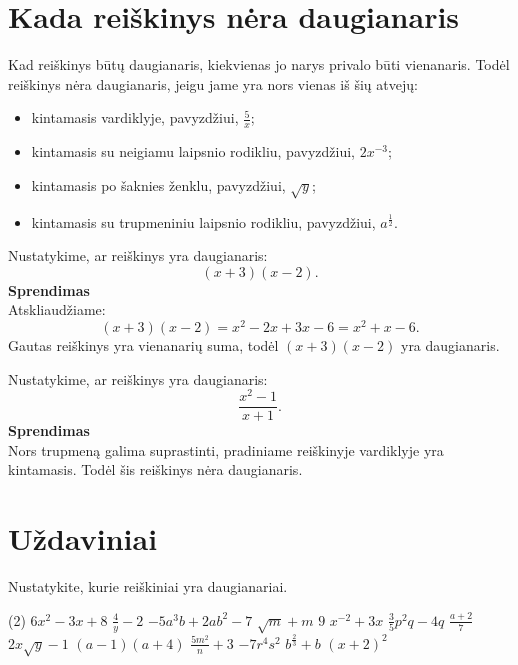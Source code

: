 \documentclass[11pt,a4paper]{scrartcl}
\begin{document}
\section{Kada reiškinys nėra daugianaris}

Kad reiškinys būtų daugianaris, kiekvienas jo narys privalo būti vienanaris. Todėl reiškinys nėra daugianaris, jeigu jame yra nors vienas iš šių atvejų:
\begin{itemize}
	\item kintamasis vardiklyje, pavyzdžiui, $\frac{5}{x}$;
	\item kintamasis su neigiamu laipsnio rodikliu, pavyzdžiui, $2x^{-3}$;
	\item kintamasis po šaknies ženklu, pavyzdžiui, $\sqrt{y}$;
	\item kintamasis su trupmeniniu laipsnio rodikliu, pavyzdžiui, $a^{\frac{1}{2}}$.
\end{itemize}

\begin{example}
Nustatykime, ar reiškinys yra daugianaris:
\[
(x+3)(x-2).
\]
\textbf{Sprendimas}\\
Atskliaudžiame:
\[
(x+3)(x-2)=x^2-2x+3x-6=x^2+x-6.
\]
Gautas reiškinys yra vienanarių suma, todėl $(x+3)(x-2)$ yra daugianaris.
\end{example}

\begin{example}
Nustatykime, ar reiškinys yra daugianaris:
\[
\frac{x^2-1}{x+1}.
\]
\textbf{Sprendimas}\\
Nors trupmeną galima suprastinti, pradiniame reiškinyje vardiklyje yra kintamasis. Todėl šis reiškinys nėra daugianaris.
\end{example}

\section{Uždaviniai}

\begin{problem}
Nustatykite, kurie reiškiniai yra daugianariai.
\begin{tasks}[label={(\arabic*)}, label-offset=0.9em](2)
	\task $6x^2-3x+8$
	\task $\frac{4}{y}-2$
	\task $-5a^3b+2ab^2-7$
	\task $\sqrt{m}+m$
	\task $9$
	\task $x^{-2}+3x$
	\task $\frac{3}{5}p^2q-4q$
	\task $\frac{a+2}{7}$
	\task $2x\sqrt{y}-1$
	\task $(a-1)(a+4)$
	\task $\frac{5m^2}{n}+3$
	\task $-7r^4s^2$
	\task $b^{\frac{2}{3}}+b$
	\task $(x+2)^2$
\end{tasks}
\end{problem}
\end{document}
